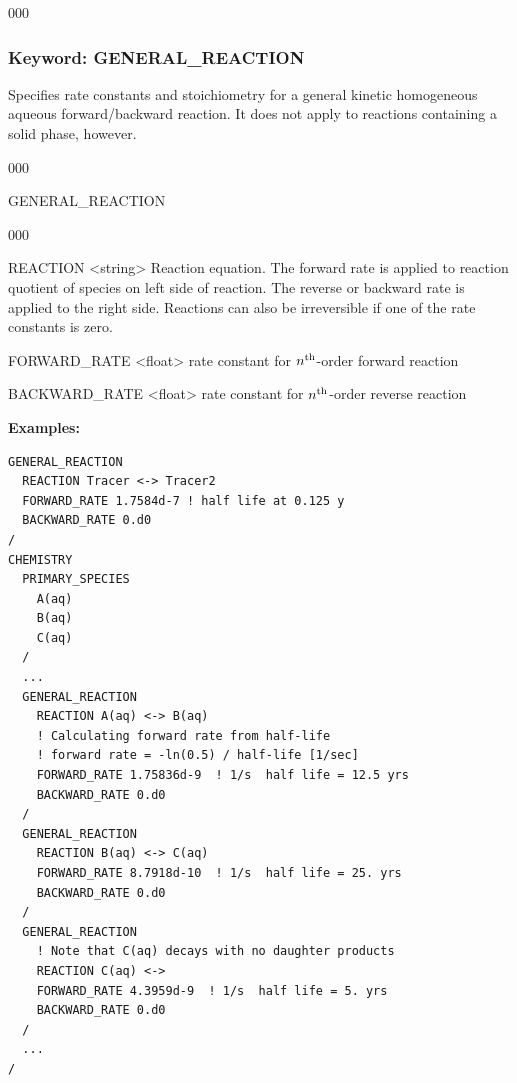 \begin{deflist}{000}
\hfill\hyperlink{target_key}{\return}

\clearpage
\protect\hypertarget{target_chem_genrxn}{}

\subsubsection{Keyword: GENERAL\_REACTION}
Specifies rate constants and stoichiometry for a general kinetic homogeneous aqueous forward/backward reaction. It does not apply to reactions containing a solid phase, however.

\hfill\hyperlink{target_key}{\return}

\begin{deflist}{000}
\item[GENERAL\_REACTION] ~

\begin{deflist}{000}

\item [REACTION] <string>
Reaction equation. The forward rate is applied to reaction quotient of species on left side of reaction. The reverse or backward rate is applied to the right side. Reactions can also be irreversible if one of the rate constants is zero.

\item [FORWARD\_RATE] <float>
rate constant for $n^{\rm th}$-order forward reaction 
\item [BACKWARD\_RATE] <float>
rate constant for $n^{\rm th}$-order reverse reaction 
\end{deflist}
\item[\keyend]
\end{deflist}

\begin{mdframed}
{\bf Examples:}
\footnotesize
\begin{verbatim}
GENERAL_REACTION
  REACTION Tracer <-> Tracer2
  FORWARD_RATE 1.7584d-7 ! half life at 0.125 y
  BACKWARD_RATE 0.d0
/
CHEMISTRY
  PRIMARY_SPECIES
    A(aq)
    B(aq)
    C(aq)
  /
  ...
  GENERAL_REACTION
    REACTION A(aq) <-> B(aq)
    ! Calculating forward rate from half-life
    ! forward rate = -ln(0.5) / half-life [1/sec]
    FORWARD_RATE 1.75836d-9  ! 1/s  half life = 12.5 yrs
    BACKWARD_RATE 0.d0
  /
  GENERAL_REACTION
    REACTION B(aq) <-> C(aq)
    FORWARD_RATE 8.7918d-10  ! 1/s  half life = 25. yrs
    BACKWARD_RATE 0.d0
  /
  GENERAL_REACTION
    ! Note that C(aq) decays with no daughter products
    REACTION C(aq) <->
    FORWARD_RATE 4.3959d-9  ! 1/s  half life = 5. yrs
    BACKWARD_RATE 0.d0
  /
  ...
/
\end{verbatim}
\normalsize
\end{mdframed}


\end{deflist}
